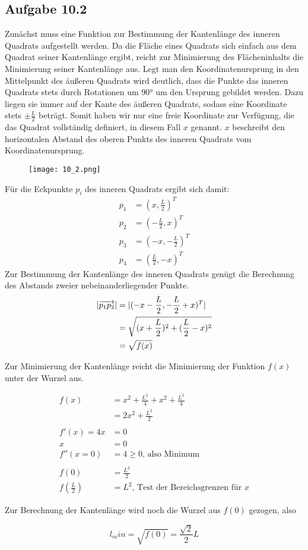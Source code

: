 \documentclass{standalone}
\begin{document}
\subsection{Aufgabe 10.2}
Zunächst muss eine Funktion zur Bestimmung der Kantenlänge des inneren Quadrats aufgestellt werden. Da die Fläche eines Quadrats sich einfach aus dem Quadrat seiner Kantenlänge ergibt, reicht zur Minimierung des Flächeninhalts die Minimierung seiner Kantenlänge aus.
Legt man den Koordinatenursprung in den Mittelpunkt des äußeren Quadrats wird deutlich, dass die Punkte das inneren Quadrats stets durch Rotationen um 90° um den Ursprung gebildet werden. Dazu liegen sie immer auf der Kante des äußeren Quadrats, sodass eine Koordinate stets $\pm \frac{L}{2}$ beträgt.
Somit haben wir nur eine freie Koordinate zur Verfügung, die das Quadrat vollständig definiert, in diesem Fall $x$ genannt.
$x$ beschreibt den horizontalen Abstand des oberen Punkts des inneren Quadrats vom Koordinatenursprung.

\begin{figure}[htbp]
    \centering
    \texttt{[image: 10\_2.png]}
\end{figure}

Für die Eckpunkte $p_i$ des inneren Quadrats ergibt sich damit:
\begin{align}
    p_1 &= (x, \frac{L}{2})^T \\
    p_2 &= (-\frac{L}{2}, x)^T \\
    p_3 &= (-x, -\frac{L}{2})^T \\
    p_4 &= (\frac{L}{2}, -x)^T
\end{align}
Zur Bestimmung der Kantenlänge des inneren Quadrats genügt die Berechnung des Abstands zweier nebeinanderliegender Punkte.
\begin{align}
    \lvert\overrightarrow{p_1 p_2}\rvert &= \lvert(-x -\frac{L}{2}, -\frac{L}{2} + x)^T\rvert \\
    &= \sqrt{(x+\frac{L}{2})^2 + (\frac{L}{2} - x)^2} \\
    &= \sqrt{f(x)}
\end{align}

Zur Minimierung der Kantenlänge reicht die Minimierung der Funktion $f(x)$ unter der Wurzel aus.

\begin{align}
    f(x) &= x^2 + \frac{L^2}{4} + x^2 + \frac{L^2}{4} \\
    &= 2x^2 + \frac{L^2}{2} \\
    \\
    f'(x) = 4x &= 0 \\
    x &= 0\\
    f''(x=0) &= 4 \geq 0 \text{, also Minimum} \\
    \\
    f(0) &= \frac{L^2}{2} \\
    f(\frac{L}{2}) &= L^2 \text{, Test der Bereichsgrenzen für } x
\end{align}

Zur Berechnung der Kantenlänge wird noch die Wurzel aus $f(0)$ gezogen, also

$$l_min = \sqrt{f(0)} = \frac{\sqrt{2}}{2} L$$
\end{document}
